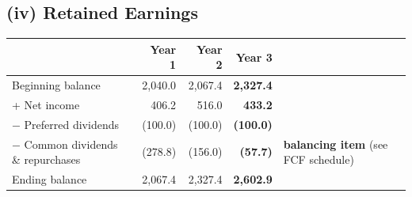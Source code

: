 \subsection{(iv) Retained Earnings}
\begin{center}
\footnotesize\setlength{\tabcolsep}{3.5pt}
\begin{tabular}{@{}lrr>{\bfseries}rl@{}}
\toprule
 & \textbf{Year 1} & \textbf{Year 2} & \textbf{Year 3} & \\
\midrule
Beginning balance & 2,040.0 & 2,067.4 & 2,327.4 & \\
+ Net income & 406.2 & 516.0 & 433.2 & \\
$-$ Preferred dividends & (100.0) & (100.0) & (100.0) & \\
$-$ Common dividends \& repurchases & (278.8) & (156.0) & (57.7) & \textbf{balancing item} (see FCF schedule)\\
Ending balance & 2,067.4 & 2,327.4 & 2,602.9 & \\
\bottomrule
\end{tabular}
\end{center}

